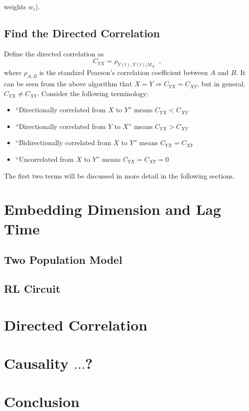 \documentclass[a4paper,11pt]{article}
\begin{document}
weights $w_i$).\subsection{Find the Directed Correlation}Define the directed correlation as $$C_{YX} = \rho_{Y(t),Y(t)|M_X}\;\;,$$where $\rho_{A,B}$ is the standard Pearson's correlation coefficient between $A$ and $B$.  It can be seen from the above algorithm that $X=Y \Rightarrow C_{YX}=C_{XY}$, but in general, $C_{YX}\neq C_{XY}$.  Consider the following terminology:\begin{itemize}\item ``Directionally correlated from $X$ to $Y$'' means $C_{YX} < C_{XY}$\item ``Directionally correlated from $Y$ to $X$'' means $C_{YX} > C_{XY}$\item ``Bidirectionally correlated from $X$ to $Y$'' means $C_{YX} = C_{XY}$\item ``Uncorrelated from $X$ to $Y$'' means $C_{YX} = C_{XY}=0$\end{itemize}The first two terms will be discussed in more detail in the following sections.
\section{Embedding Dimension and Lag Time}
\subsection{Two Population Model}
\subsection{RL Circuit}
\section{Directed Correlation}
\section{Causality $\ldots$?}
\section{Conclusion}
\end{document}
